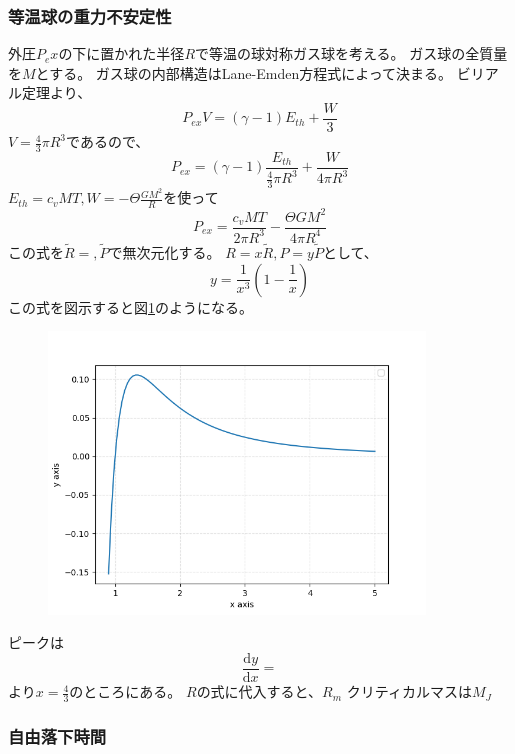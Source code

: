 \documentclass{jsarticle}
\newcommand{\dder}[2][]{\frac{\mathrm{d}#1}{\mathrm{d}#2}}
\newcommand{\ethe}{E_{th}}
\newcommand{\beq}{\begin{equation}}
\newcommand{\eeq}{\end{equation}}
\begin{document}
\subsubsection{等温球の重力不安定性}
外圧$P_ex$の下に置かれた半径$R$で等温の球対称ガス球を考える。
ガス球の全質量を$M$とする。
ガス球の内部構造はLane-Emden方程式によって決まる。
ビリアル定理より、
\beq
P_{ex} V = (\gamma -1)\ethe + \frac{W}{3}
\eeq
$V = \frac{4}{3} \pi R^3$であるので、
\beq
P_{ex} = (\gamma -1)\frac{\ethe }{\frac{4}{3} \pi R^3}+ \frac{W}{4 \pi R^3}
\eeq
$\ethe = c_v MT , W = - \Theta \frac{GM^2}{R}$を使って
\beq
P_{ex} = \frac{c_v MT}{2\pi R^3} - \frac{\Theta GM^2}{4\pi R^4}
\eeq
この式を$\tilde{R} = , \tilde{P}$で無次元化する。
$R = x \tilde{R}, P = y \tilde{P}$として、
\beq
    y = \frac{1}{x^3} \left(1 - \frac{1}{x}\right)
\eeq
この式を図示すると図\ref{fig:spherical}のようになる。
\begin{figure}[H]
    \includegraphics[clip,width=10.0cm]{graph/spherical.png}
    \caption{}
    \label{fig:spherical}
\end{figure}
ピークは
\beq
\dder[y]{x} = 
\eeq
より$x = \frac{4}{3}$のところにある。
$R$の式に代入すると、$R_m$
クリティカルマスは$M_J$

\subsubsection{自由落下時間}
\end{document}
